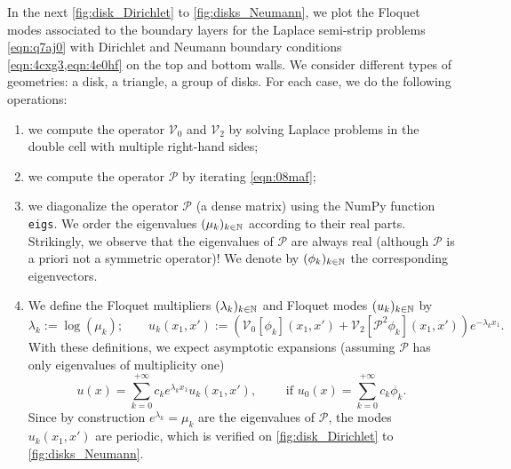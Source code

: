 \documentclass[a4paper,10pt,reqno]{amsart}
\begin{document}
In the next \cref{fig:disk_Dirichlet} to \cref{fig:disks_Neumann}, we plot the Floquet modes
associated to the boundary layers for the Laplace semi-strip problems
\cref{eqn:q7aj0} with Dirichlet and Neumann boundary conditions
\cref{eqn:4cxg3,eqn:4e0hf} on the top and bottom walls. We consider different types
of geometries: a disk, a triangle, a group of disks.  For each case, we do the
following operations:   
\begin{enumerate}
    \item we compute the operator $\mathcal{V}_0$ and $\mathcal{V}_2$ by solving
        Laplace problems in the double cell with multiple right-hand sides;     
    \item we compute the operator $\mathcal{P}$ by iterating \cref{eqn:08maf};  
    \item we diagonalize the operator $\mathcal{P}$ (a dense matrix) using the NumPy
        function \texttt{eigs}. We order the eigenvalues $(\mu_k)_{k\in\mathbb{N}}$ 
        according to their real parts. {\color{blue} Strikingly, we observe that the
        eigenvalues of $\mathcal{P}$ are always real (although $\mathcal{P}$ is a
        priori not
    a symmetric operator)!} We denote by $(\phi_k)_{k\in\mathbb{N}}$ the corresponding
    eigenvectors.
    \item We define the Floquet multipliers   $(\lambda_k)_{k\in\mathbb{N}}$  and Floquet
        modes $(u_k)_{k\in\mathbb{N}}$ by
        \[
        \lambda_k := \log(\mu_k); \qquad    
        u_k(x_1,x'):=
        (\mathcal{V}_0[\phi_k](x_1,x')+\mathcal{V}_2[\mathcal{P}^{2}\phi_k](x_1,x'))e^{-\lambda_k
        x_1}.
        \] 
        With these definitions, we expect asymptotic expansions (assuming
        $\mathcal{P}$ has only eigenvalues of multiplicity one)         
        \[
        u(x)=\sum_{k=0}^{+\infty} c_k e^{\lambda_k x_1}u_k(x_1,x'), \qquad \text{ if
        }u_0(x)=\sum_{k=0}^{+\infty}c_k \phi_k.
        \]  
        Since by construction $e^{\lambda_k}=\mu_k$ are the eigenvalues of
        $\mathcal{P}$, the modes $u_k(x_1,x')$ are periodic, which is verified on
        \cref{fig:disk_Dirichlet} to \cref{fig:disks_Neumann}. 
\end{enumerate}
    
    
    
\end{document}

